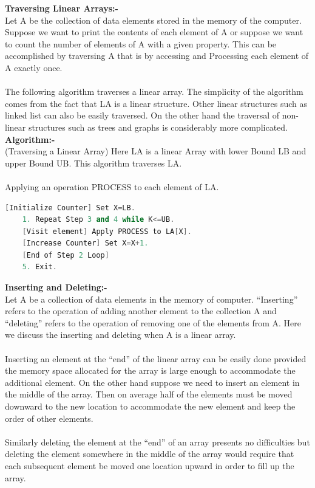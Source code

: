 \documentclass[11pt]{article}            %
\begin{document}
\textbf{Traversing Linear Arrays:-}\\
Let A be the collection of data elements stored in the memory of the computer. Suppose we want to print the contents of each element of A or suppose we want to count the number of elements of A with a given property. This can be accomplished by traversing A that is by accessing and Processing each element of A exactly once.\\~\\
 The following algorithm traverses a linear array. The simplicity of the algorithm comes from the fact that LA is a linear structure. Other linear structures such as linked list can also be easily
traversed. On the other hand the traversal of non-linear structures such as trees and graphs is considerably more complicated.\\

\textbf{Algorithm:-}\\
(Traversing a Linear Array) Here LA is a linear Array with lower Bound LB and upper Bound
UB. This algorithm traverses LA.\\~\\
Applying an operation PROCESS to each element of LA.\\

\begin{lstlisting}[language=C++]
[Initialize Counter] Set X=LB.
	1. Repeat Step 3 and 4 while K<=UB.
	[Visit element] Apply PROCESS to LA[X].
	[Increase Counter] Set X=X+1.
	[End of Step 2 Loop]
	5. Exit.
\end{lstlisting}

\textbf{Inserting and Deleting:-}\\
Let A be a collection of data elements in the memory of computer. “Inserting” refers to the
operation of adding another element to the collection A and “deleting” refers to the operation of
removing one of the elements from A. Here we discuss the inserting and deleting when A is a
linear array.\\~\\
Inserting an element at the “end” of the linear array can be easily done provided the memory space
allocated for the array is large enough to accommodate the additional element. On the other hand
suppose we need to insert an element in the middle of the array. Then on average half of the
elements must be moved downward to the new location to accommodate the new element and keep
the order of other elements.\\~\\
Similarly deleting the element at the “end” of an array presents no difficulties but deleting the
element somewhere in the middle of the array would require that each subsequent element be
moved one location upward in order to fill up the array.\\
\end{document}
